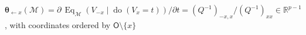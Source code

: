 \(\boldsymbol\theta_{\leftarrow x}(\mathcal M)=\partial\,\operatorname{Eq}_{\mathcal M}(V_{-x}\mid\operatorname{do}(V_x=t))/\partial t=(Q^{-1})_{-x,x}/(Q^{-1})_{xx}\in\mathbb R^{p-1}\), with coordinates ordered by \(\mathsf O\setminus\{x\}\)